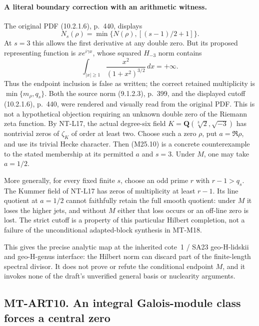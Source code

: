 \paragraph{A literal boundary correction with an arithmetic witness.}
The original PDF (10.2.1.6), p.~440, displays
\[
 N_s(\rho)=\min\{N(\rho),[(s-1)/2+1]\}.
\]
At $s=3$ this allows the first derivative at any double zero.
But its proposed representing function is
$x e^{i\gamma x}$, whose squared $H_{-3}$ norm contains
\[
              \int_{|x|\ge1}\frac{x^2}{(1+x^2)^{3/2}}\,dx
                         =+\infty.
 \tag{M25.10}
\]
Thus the endpoint inclusion is false as written; the
correct retained multiplicity is
$\min\{m_\rho,q_s\}$. Both the source norm (9.1.2.3),
p.~399, and the displayed cutoff (10.2.1.6), p.~440, were
rendered and visually read from the original PDF.
This is not a hypothetical objection requiring an unknown
double zero of the Riemann zeta function. By NT-L17,
the actual degree-six field
$K=\mathbf Q(\sqrt[3]{2},\sqrt{-3})$ has nontrivial zeros
of $\zeta_K$ of order at least two. Choose such a zero
$\rho$, put $a=\Re\rho$, and use its trivial Hecke
character. Then (M25.10) is a concrete counterexample
to the stated membership at its permitted $a$ and $s=3$.
Under $M$, one may take $a=1/2$.

More generally, for every fixed finite $s$, choose an odd
prime $r$ with $r-1>q_s$. The Kummer field of NT-L17
has zeros of multiplicity at least $r-1$. Its line quotient
at $a=1/2$ cannot faithfully retain the full smooth
quotient: under $M$ it loses the higher jets, and without
$M$ either that loss occurs or an off-line zero is lost.
The strict cutoff is a property of this particular
Hilbert completion, not a failure of the unconditional
adapted-block synthesis in MT-M18.

This gives the precise analytic map at the inherited
cote~1 / SA23 geo-H-lidskii and geo-H-genus interface:
the Hilbert norm can discard part of the finite-length
spectral divisor. It does not prove or refute the
conditional endpoint $M$, and it invokes none of the
draft's unverified general basis or nuclearity arguments.

\subsection*{MT-ART10. An integral Galois-module class forces a central zero}

